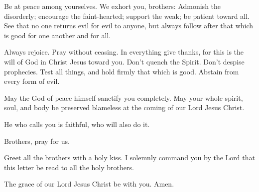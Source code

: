 Be at peace among yourselves.  We exhort you, brothers:
Admonish the disorderly; encourage the faint-hearted; support the weak;
be patient toward all.  See that no one returns evil for
evil to anyone, but always follow after that which is good for one
another and for all.

 Always rejoice.  Pray without ceasing.
 In everything give thanks, for this is the will of God
in Christ Jesus toward you.  Don't quench the Spirit.
 Don't despise prophecies.  Test all
things, and hold firmly that which is good.  Abstain from
every form of evil.

 May the God of peace himself sanctify you completely.
May your whole spirit, soul, and body be preserved blameless at the
coming of our Lord Jesus Christ.

 He who calls you is faithful, who will also do it.

 Brothers, pray for us.

 Greet all the brothers with a holy kiss. 
I solemnly command you by the Lord that this letter be read to all the
holy brothers.

 The grace of our Lord Jesus Christ be with you. Amen.
